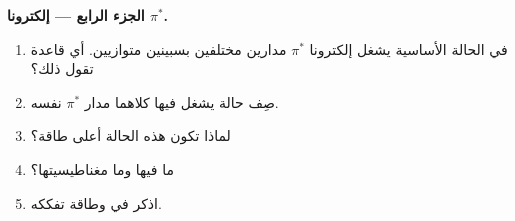 \begin{problem}
\medskip
\noindent\textbf{الجزء الرابع --- إلكترونا $\pi^*$.}
\begin{enumerate}[resume]
  \item في الحالة الأساسية يشغل إلكترونا $\pi^*$ مدارين مختلفين بسبينين
        متوازيين. أي قاعدة تقول ذلك؟
  \item صِف حالة يشغل فيها كلاهما مدار $\pi^*$ نفسه.
  \item لماذا تكون هذه الحالة أعلى طاقة؟
  \item ما  فيها وما مغناطيسيتها؟
  \item اذكر  في  وطاقة تفككه.
\end{enumerate}
\end{problem}
